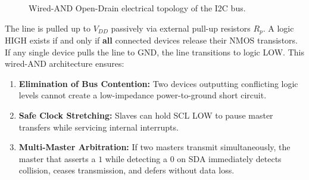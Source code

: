 \documentclass[11pt,a4paper,oneside]{report}
\begin{document}
\begin{figure}[h!]
\centering
{}
\caption{Wired-AND Open-Drain electrical topology of the I2C bus.}
\end{figure}

The line is pulled up to $V_{DD}$ passively via external pull-up resistors $R_p$. A logic HIGH exists if and only if \textbf{all} connected devices release their NMOS transistors. If any single device pulls the line to GND, the line transitions to logic LOW. This wired-AND architecture ensures:
\begin{enumerate}
    \item \textbf{Elimination of Bus Contention:} Two devices outputting conflicting logic levels cannot create a low-impedance power-to-ground short circuit.
    \item \textbf{Safe Clock Stretching:} Slaves can hold SCL LOW to pause master transfers while servicing internal interrupts.
    \item \textbf{Multi-Master Arbitration:} If two masters transmit simultaneously, the master that asserts a $1$ while detecting a $0$ on SDA immediately detects collision, ceases transmission, and defers without data loss.
\end{enumerate}

\end{document}
